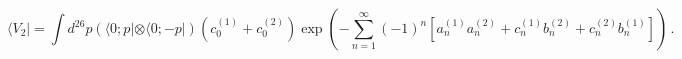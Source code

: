 \begin{equation}
\langle V_2 | = \int d^{26} p
\left( \langle 0; p | \otimes \langle 0; -p | \right)
(c^{(1)}_0 + c^{(2)}_0)\exp\left(
-\sum_{n = 1}^{ \infty} (-1)^n
[a^{(1)}_n a^{(2)}_n+c^{(1)}_n b^{(2)}_n+c^{(2)}_n b^{(1)}_n] \right)\,.
 \label{eq:v2}
\end{equation}

